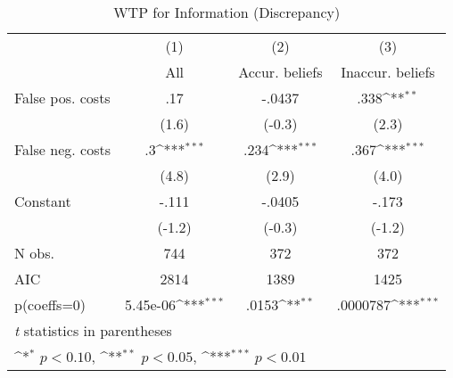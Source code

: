 \begin{table}[htbp]\centering
\def\sym#1{\ifmmode^{#1}\else\(^{#1}\)\fi}
\caption{WTP for Information (Discrepancy)}
\begin{tabular}{l*{3}{c}}
\hline\hline
                &\multicolumn{1}{c}{(1)}&\multicolumn{1}{c}{(2)}&\multicolumn{1}{c}{(3)}\\
                &\multicolumn{1}{c}{All}&\multicolumn{1}{c}{Accur. beliefs}&\multicolumn{1}{c}{Inaccur. beliefs}\\
\hline
False pos. costs&      .17         &   -.0437         &     .338\sym{**} \\
                &    (1.6)         &   (-0.3)         &    (2.3)         \\
False neg. costs&       .3\sym{***}&     .234\sym{***}&     .367\sym{***}\\
                &    (4.8)         &    (2.9)         &    (4.0)         \\
Constant        &    -.111         &   -.0405         &    -.173         \\
                &   (-1.2)         &   (-0.3)         &   (-1.2)         \\
\hline
N obs.          &      744         &      372         &      372         \\
AIC             &     2814         &     1389         &     1425         \\
p(coeffs=0)     & 5.45e-06\sym{***}&    .0153\sym{**} & .0000787\sym{***}\\
\hline\hline
\multicolumn{4}{l}{\footnotesize \textit{t} statistics in parentheses}\\
\multicolumn{4}{l}{\footnotesize \sym{*} \(p<0.10\), \sym{**} \(p<0.05\), \sym{***} \(p<0.01\)}\\
\end{tabular}
\end{table}
